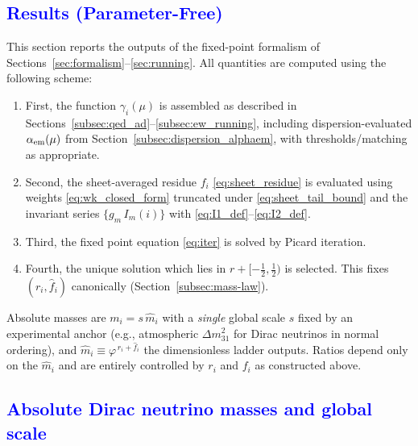 \documentclass[%
amsmath,amssymb,
aps,
prb,
floatfix,showkeys
]{revtex4-2}
\newcommand{\modif}[1]{\textcolor{blue}{#1}}
\begin{document}
{\modif{\section{Results (Parameter-Free)}
\label{sec:results}}}

This section reports the outputs of the fixed-point formalism of Sections~\ref{sec:formalism}--\ref{sec:running}. All quantities are computed using the following scheme:
\begin{enumerate}
\item First, the function $\gamma_i(\mu)$ is assembled as described in Sections~\ref{subsec:qed_ad}--\ref{subsec:ew_running}, including dispersion-evaluated $\alpha_{\rm em}(\mu)$ from Section~\ref{subsec:dispersion_alphaem}, with thresholds/matching as appropriate.
\item Second, the sheet-averaged residue $f_i$ \eqref{eq:sheet_residue} is evaluated using weights \eqref{eq:wk_closed_form} truncated under \eqref{eq:sheet_tail_bound} and the invariant series $\{g_m\,I_m(i)\}$ with \eqref{eq:I1_def}--\eqref{eq:I2_def}.
\item Third, the fixed point equation \eqref{eq:iter} is solved by Picard iteration.
\item Fourth, the unique solution which lies in $r+[-\tfrac{1}{2},\tfrac{1}{2})$ is selected. This fixes $(r_i,\widehat f_i)$ canonically (Section~\ref{subsec:mass-law}).
\end{enumerate}
Absolute masses are $m_i = s\,\widehat m_i$ with a \emph{single} global scale $s$ fixed by an experimental anchor (e.g., atmospheric $\Delta m^2_{31}$ for Dirac neutrinos in normal ordering), and $\widehat m_i\equiv \varphi^{\,r_i+\widehat f_i}$ the dimensionless ladder outputs. Ratios depend only on the $\widehat m_i$ and are entirely controlled by $r_i$ and $f_i$ as constructed above.

{\modif{\subsection{Absolute Dirac neutrino masses and global scale}
\label{subsec:nu-absolute}}}
\end{document}
